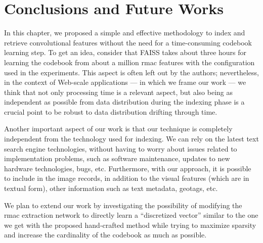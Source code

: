 
\section{Conclusions and Future Works}
\label{sec:str:conclusion}
In this chapter, we proposed a simple and effective methodology to index and retrieve convolutional features without the need for a time-consuming codebook learning step.
To get an idea, consider that FAISS takes about three hours for learning the codebook from about a million \gls{rmac} features with the configuration used in the experiments.
This aspect is often left out by the authors; nevertheless, in the context of Web-scale applications --- in which we frame our work --- we think that not only processing time is a relevant aspect, but also being as independent as possible from data distribution during the indexing phase is a crucial point to be robust to data distribution drifting through time.

Another important aspect of our work is that our technique is completely independent from the technology used for indexing.
We can rely on the latest text search engine technologies, without having to worry about issues related to implementation problems, such as software maintenance, updates to new hardware technologies, bugs, etc.
Furthermore, with our approach, it is possible to include in the image records, in addition to the visual features (which are in textual form), other information such as text metadata, geotags, etc.

We plan to extend our work by investigating the possibility of modifying the \gls{rmac} extraction network to directly learn a ``discretized vector'' similar to the one we get with the proposed hand-crafted method while trying to maximize sparsity and increase the cardinality of the codebook as much as possible.
